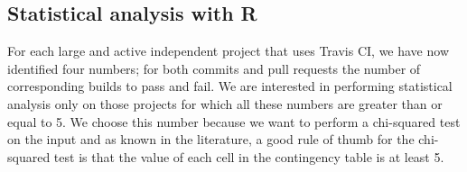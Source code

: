 \subsection{Statistical analysis with R}
For each large and active independent project that uses Travis CI, we have now identified four numbers; for both commits and pull requests the number of corresponding builds to pass and fail.
We are interested in performing statistical analysis only on those projects for which all these numbers are greater than or equal to 5.
We choose this number because we want to perform a chi-squared test on the input and as known in the literature, a good rule of thumb for the chi-squared test is that the value of each cell in the contingency table is at least 5.
